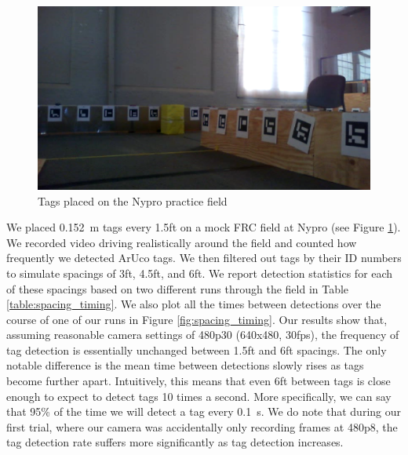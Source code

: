 \documentclass{article}
\begin{document}
    \begin{figure}[H]
      \centering
      \includegraphics[width=1\linewidth]{./images/nypro_tag_spacing.png}
      \caption{Tags placed on the Nypro practice field}
      \label{fig:nypro_tag_spacing}
    \end{figure}

    We placed \SI{0.152}{\meter} tags every 1.5ft on a mock FRC field at Nypro (see Figure \ref{fig:nypro_tag_spacing}). We recorded video driving realistically around the field and counted how frequently we detected ArUco tags. We then filtered out tags by their ID numbers to simulate spacings of 3ft, 4.5ft, and 6ft. We report detection statistics for each of these spacings based on two different runs through the field in Table \ref{table:spacing_timing}. We also plot all the times between detections over the course of one of our runs in Figure \ref{fig:spacing_timing}. Our results show that, assuming reasonable camera settings of 480p30 (640x480, 30fps), the frequency of tag detection is essentially unchanged between 1.5ft and 6ft spacings. The only notable difference is the mean time between detections slowly rises as tags become further apart. Intuitively, this means that even 6ft between tags is close enough to expect to detect tags 10 times a second. More specifically, we can say that 95\% of the time we will detect a tag every \SI{0.1}{\second}. We do note that during our first trial, where our camera was accidentally only recording frames at 480p8, the tag detection rate suffers more significantly as tag detection increases.
\end{document}

